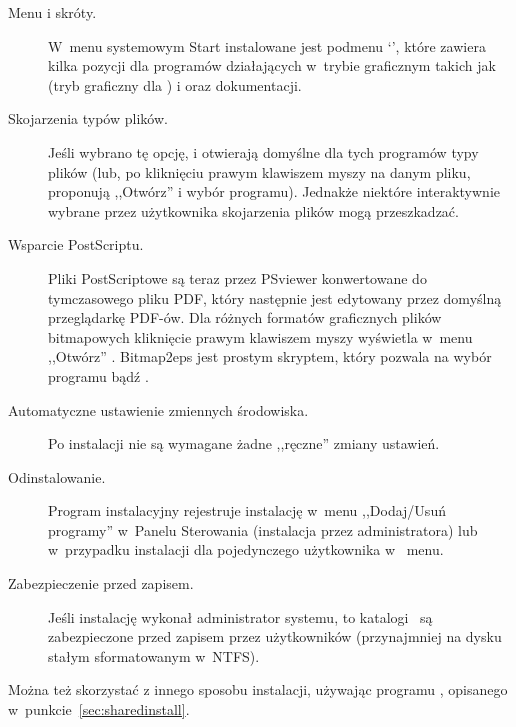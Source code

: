\documentclass{article}
\begin{document}
\begin{description}
\item[Menu i skróty.]
W~menu systemowym Start  instalowane jest podmenu `\TL{}',
 które zawiera kilka pozycji dla programów działających w~trybie graficznym takich jak  (tryb graficzny dla ) i   %
  oraz dokumentacji.
\item[Skojarzenia typów plików.] Jeśli wybrano tę opcję,
  i   otwierają domyślne
  dla tych programów typy plików (lub, po kliknięciu prawym klawiszem
  myszy na danym pliku, proponują ,,Otwórz'' i wybór programu). Jednakże niektóre interaktywnie wybrane przez użytkownika skojarzenia plików mogą przeszkadzać.
  
  \item[Wsparcie PostScriptu.] Pliki PostScriptowe są teraz przez PSviewer konwertowane do tymczasowego pliku PDF, który następnie jest edytowany przez domyślną przeglądarkę PDF-ów.
Dla różnych formatów graficznych plików
 bitmapowych kliknięcie prawym klawiszem myszy wyświetla w~menu ,,Otwórz''
 . Bitmap2eps jest prostym skryptem, który pozwala
 na wybór programu  bądź .
 
\item[Automatyczne ustawienie zmiennych środowiska.]
 Po instalacji nie są wymagane żadne ,,ręczne'' zmiany ustawień.
 
\item[Odinstalowanie.]  Program instalacyjny rejestruje instalację
w~menu ,,Dodaj/Usuń programy'' w~Panelu Sterowania (instalacja przez administratora) lub  w~przypadku instalacji dla pojedynczego użytkownika w \TL\ menu.

\item[Zabezpieczenie przed zapisem.] Jeśli instalację wykonał
administrator systemu, to katalogi \TL\ są zabezpieczone przed zapisem przez użytkowników (przynajmniej na dysku stałym sformatowanym w~NTFS).
\end{description}
Można też skorzystać z innego sposobu instalacji, używając  programu ,
opisanego w~punkcie~\ref{sec:sharedinstall}.
\end{document}
